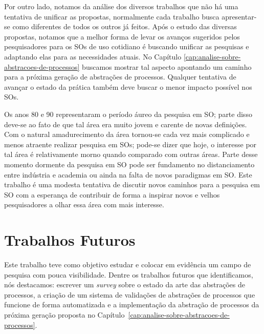 Por outro lado, notamos da análise dos diversos trabalhos que não há uma
tentativa de unificar as propostas, normalmente cada trabalho busca
apresentar-se como diferentes de todos os outros já feitos. Após o estudo das
diversas propostas, notamos que a melhor forma de levar os avanços sugeridos
pelos pesquisadores para os SOs de uso cotidiano é buscando unificar as
pesquisas e adaptando elas para as necessidades atuais. No Capítulo
\ref{cap:analise-sobre-abstracoes-de-processos} buscamos mostrar tal aspecto
apontando um caminho para a próxima geração de abstrações de processos.
Qualquer tentativa de avançar o estado da prática também deve buscar o menor
impacto possível nos SOs.

Os anos 80 e 90 representaram o período áureo da pesquisa em SO; parte disso
deve-se ao fato de que tal área era muito jovem e carente de novas
definições. Com o natural amadurecimento da área tornou-se cada vez mais
complicado e menos atraente realizar pesquisa em SOs; pode-se dizer que hoje, o
interesse por tal área é relativamente morno quando comparado com outras áreas.
Parte desse momento dormente da pesquisa em SO pode ser fundamento no
distanciamento entre indústria e academia ou ainda na falta de novos
paradigmas em SO. Este trabalho é uma modesta tentativa de discutir
novos caminhos para a pesquisa em SO com a esperança de contribuir de forma a
inspirar novos e velhos pesquisadores a olhar essa área com mais interesse.

\section{Trabalhos Futuros}


Este trabalho teve como objetivo estudar e colocar em evidência um campo de
pesquisa com pouca visibilidade. Dentre os trabalhos futuros que identificamos,
nós destacamos: escrever um \textit{survey} sobre o estado da arte das
abstrações de processos, a criação de um sistema de validações de abstrações de
processos que funcione de forma automatizada e a implementação da abstração de
processos da próxima geração proposta no
Capítulo~\ref{cap:analise-sobre-abstracoes-de-processos}.

